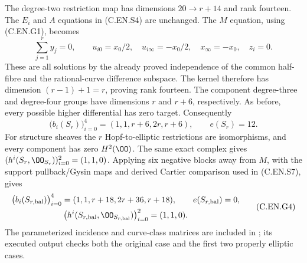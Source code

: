 The degree-two restriction map has dimensions
$20\to r+14$ and rank fourteen. The $E_i$ and $A$
equations in (C.EN.S4) are unchanged. The $M$
equation, using (C.EN.G1), becomes
\[
 \sum_{j=1}^r y_j=0,\qquad
 u_{i0}=x_0/2,\quad u_{i\infty}=-x_0/2,\quad
 x_\infty=-x_0,\quad z_i=0.
                                                               \tag{C.EN.G2}
\]
These are all solutions by the already proved
independence of the common half-fibre and the
rational-curve difference subspace. The kernel
therefore has dimension $(r-1)+1=r$, proving
rank fourteen. The component degree-three and
degree-four groups have dimensions $r$ and $r+6$,
respectively. As before, every possible higher
differential has zero target. Consequently
\[
 \bigl(b_i(S_r)\bigr)_{i=0}^4=(1,1,r+6,2r,r+6),
 \qquad e(S_r)=12.
                                                               \tag{C.EN.G3}
\]
For structure sheaves the $r$ Hopf-to-elliptic
restrictions are isomorphisms, and every component
has zero $H^2(\OO)$. The same exact complex gives
$(h^i(S_r,\OO_{S_r}))_{i=0}^2=(1,1,0)$.
Applying six negative blocks away from $M$, with
the support pullback/Gysin maps and derived Cartier
comparison used in (C.EN.S7), gives
\[
 \begin{gathered}
 \bigl(b_i(S_{r,\mathrm{bal}})\bigr)_{i=0}^4
      =(1,1,r+18,2r+36,r+18),\qquad e(S_{r,\mathrm{bal}})=0,\\
 \bigl(h^i(S_{r,\mathrm{bal}},\OO_{S_{r,\mathrm{bal}}})\bigr)_{i=0}^2
      =(1,1,0).
 \end{gathered}                                                \tag{C.EN.G4}
\]
The parameterized incidence and curve-class matrices
are included in ; its
executed output checks both the original case and
the first two properly elliptic cases.
